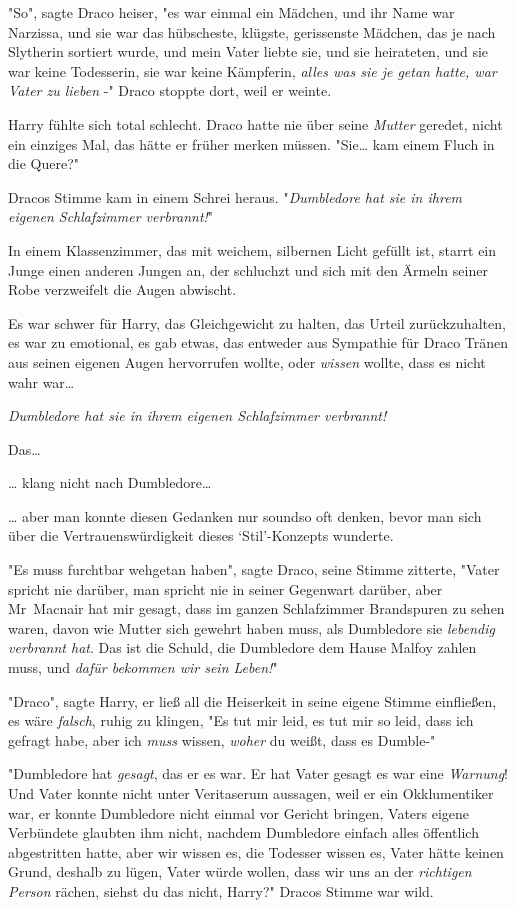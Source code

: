 {"So", sagte Draco heiser, "es war einmal ein Mädchen, und ihr Name war Narzissa, und sie war das hübscheste, klügste, gerissenste Mädchen, das je nach Slytherin sortiert wurde, und mein Vater liebte sie, und sie heirateten, und sie war keine Todesserin, sie war keine Kämpferin, \emph{alles was sie je getan hatte, war Vater zu lieben} -" Draco stoppte dort, weil er weinte.

Harry fühlte sich total schlecht. Draco hatte nie über seine \emph{Mutter} geredet, nicht ein einziges Mal, das hätte er früher merken müssen. "Sie… kam einem Fluch in die Quere?"

Dracos Stimme kam in einem Schrei heraus. "\emph{Dumbledore hat sie in ihrem eigenen Schlafzimmer verbrannt!}"

In einem Klassenzimmer, das mit weichem, silbernen Licht gefüllt ist, starrt ein Junge einen anderen Jungen an, der schluchzt und sich mit den Ärmeln seiner Robe verzweifelt die Augen abwischt.

Es war schwer für Harry, das Gleichgewicht zu halten, das Urteil zurückzuhalten, es war zu emotional, es gab etwas, das entweder aus Sympathie für Draco Tränen aus seinen eigenen Augen hervorrufen wollte, oder \emph{wissen} wollte, dass es nicht wahr war…

\emph{Dumbledore hat sie in ihrem eigenen Schlafzimmer verbrannt!}

Das…

… klang nicht nach Dumbledore…

… aber man konnte diesen Gedanken nur soundso oft denken, bevor man sich über die Vertrauenswürdigkeit dieses `Stil'-Konzepts wunderte.

"Es muss furchtbar wehgetan haben", sagte Draco, seine Stimme zitterte, "Vater spricht nie darüber, man spricht nie in seiner Gegenwart darüber, aber Mr~Macnair hat mir gesagt, dass im ganzen Schlafzimmer Brandspuren zu sehen waren, davon wie Mutter sich gewehrt haben muss, als Dumbledore sie \emph{lebendig verbrannt hat}. Das ist die Schuld, die Dumbledore dem Hause Malfoy zahlen muss, und \emph{dafür bekommen wir sein Leben!}"

"Draco", sagte Harry, er ließ all die Heiserkeit in seine eigene Stimme einfließen, es wäre \emph{falsch}, ruhig zu klingen, "Es tut mir leid, es tut mir so leid, dass ich gefragt habe, aber ich \emph{muss} wissen, \emph{woher} du weißt, dass es Dumble-"

"Dumbledore hat \emph{gesagt}, das er es war. Er hat Vater gesagt es war eine \emph{Warnung}! Und Vater konnte nicht unter Veritaserum aussagen, weil er ein Okklumentiker war, er konnte Dumbledore nicht einmal vor Gericht bringen, Vaters eigene Verbündete glaubten ihm nicht, nachdem Dumbledore einfach alles öffentlich abgestritten hatte, aber wir wissen es, die Todesser wissen es, Vater hätte keinen Grund, deshalb zu lügen, Vater würde wollen, dass wir uns an der \emph{richtigen Person} rächen, siehst du das nicht, Harry?" Dracos Stimme war wild.

}
